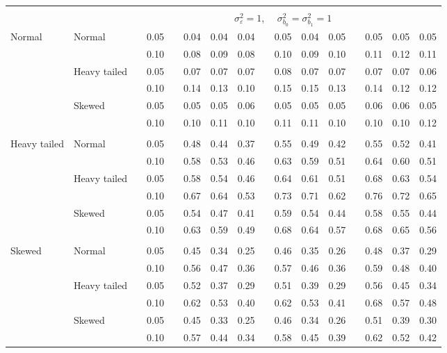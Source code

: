 \documentclass[12pt]{article} %
\begin{document}
\begin{table}[ht]
\begin{scriptsize}
\begin{center}
\begin{tabular}{ll p{.1cm} c p{.1cm} rrr p{.1cm} rrr p{.1cm} rrr}
&&&&&&&&&&&&&&&\\
& && && \multicolumn{9}{c}{$\sigma_{\varepsilon}^2 = 1$, \ \ $\sigma_{b_0}^2 = \sigma_{b_1}^2 = 1$} \\ \cline{6-16}
\rowcolor{gray!20}Normal       & Normal       && 0.05 &&   0.04 & 0.04 & 0.04 && 0.05 & 0.04 & 0.05 && 0.05 & 0.05 & 0.05 \\
\rowcolor{gray!20}             &              && 0.10 &&   0.08 & 0.09 & 0.08 && 0.10 & 0.09 & 0.10 && 0.11 & 0.12 & 0.11 \\
\rowcolor{gray!20}             & Heavy tailed && 0.05 &&   0.07 & 0.07 & 0.07 && 0.08 & 0.07 & 0.07 && 0.07 & 0.07 & 0.06 \\
\rowcolor{gray!20}             &              && 0.10 &&   0.14 & 0.13 & 0.10 && 0.15 & 0.15 & 0.13 && 0.14 & 0.12 & 0.12 \\
\rowcolor{gray!20}             & Skewed       && 0.05 &&   0.05 & 0.05 & 0.06 && 0.05 & 0.05 & 0.05 && 0.06 & 0.06 & 0.05 \\
\rowcolor{gray!20}             &              && 0.10 &&   0.10 & 0.11 & 0.10 && 0.11 & 0.11 & 0.10 && 0.10 & 0.10 & 0.12 \\
             &&&&&&&&&&&&&&&\\
Heavy tailed & Normal       && 0.05 &&   0.48 & 0.44 & 0.37 && 0.55 & 0.49 & 0.42 && 0.55 & 0.52 & 0.41 \\
             &              && 0.10 &&   0.58 & 0.53 & 0.46 && 0.63 & 0.59 & 0.51 && 0.64 & 0.60 & 0.51 \\
             & Heavy tailed && 0.05 &&   0.58 & 0.54 & 0.46 && 0.64 & 0.61 & 0.51 && 0.68 & 0.63 & 0.54 \\
             &              && 0.10 &&   0.67 & 0.64 & 0.53 && 0.73 & 0.71 & 0.62 && 0.76 & 0.72 & 0.65 \\
             & Skewed       && 0.05 &&   0.54 & 0.47 & 0.41 && 0.59 & 0.54 & 0.44 && 0.58 & 0.55 & 0.44 \\
             &              && 0.10 &&   0.63 & 0.59 & 0.49 && 0.68 & 0.64 & 0.57 && 0.68 & 0.65 & 0.56 \\
             &&&&&&&&&&&&&&&\\
Skewed       & Normal       && 0.05 &&   0.45 & 0.34 & 0.25 && 0.46 & 0.35 & 0.26 &&  0.48 & 0.37 & 0.29 \\
             &              && 0.10 &&   0.56 & 0.47 & 0.36 && 0.57 & 0.46 & 0.36 &&  0.59 & 0.48 & 0.40 \\
             & Heavy tailed && 0.05 &&   0.52 & 0.37 & 0.29 && 0.51 & 0.39 & 0.29 &&  0.56 & 0.45 & 0.34 \\
             &              && 0.10 &&   0.62 & 0.53 & 0.40 && 0.62 & 0.53 & 0.41 &&  0.68 & 0.57 & 0.48 \\
             & Skewed       && 0.05 &&   0.45 & 0.33 & 0.25 && 0.46 & 0.34 & 0.26 &&  0.51 & 0.39 & 0.30 \\
             &              && 0.10 &&   0.57 & 0.44 & 0.34 && 0.58 & 0.45 & 0.39 &&  0.62 & 0.52 & 0.42 \\



\end{tabular}
\end{center}
\end{scriptsize}
\end{table}
\end{document}
